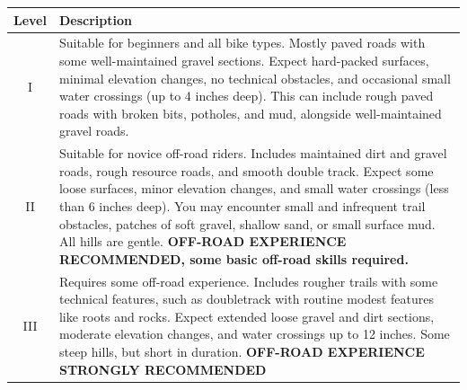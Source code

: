 \documentclass{article}
\begin{document}
\begin{minipage}[t]{1\linewidth}
    \begin{center}
        \begin{tabular}{|c|p{14cm}|}
            \hline
            \textbf{Level} & \textbf{Description}                                                                                                                                                                                                                                                                                                                                                                            \\
            \hline
            I              & Suitable for beginners and all bike types. Mostly paved roads with some well-maintained gravel sections. Expect hard-packed surfaces, minimal elevation changes, no technical obstacles, and occasional small water crossings (up to 4 inches deep). This can include rough paved roads with broken bits, potholes, and mud, alongside well-maintained gravel roads.                                                                                                                                                                                                                                                                                                            \\
            \hline
            II             & Suitable for novice off-road riders. Includes maintained dirt and gravel roads, rough resource roads, and smooth double track. Expect some loose surfaces, minor elevation changes, and small water crossings (less than 6 inches deep). You may encounter small and infrequent trail obstacles, patches of soft gravel, shallow sand, or small surface mud. All hills are gentle. \textbf{OFF-ROAD EXPERIENCE RECOMMENDED, some basic off-road skills required.}                                                                                                                                                                                     \\
            \hline
            III            & Requires some off-road experience. Includes rougher trails with some technical features, such as doubletrack with routine modest features like roots and rocks. Expect extended loose gravel and dirt sections, moderate elevation changes, and water crossings up to 12 inches. Some steep hills, but short in duration. \textbf{OFF-ROAD EXPERIENCE STRONGLY RECOMMENDED}                                                                                                                                                                                                                     \\

\end{tabular}
\end{center}
\end{minipage}
\end{document}
